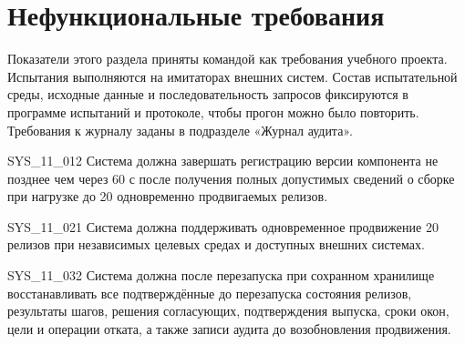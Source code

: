 \documentclass{tpks}
\begin{document}
\section{Нефункциональные требования}\label{sec:nonfunctional}

Показатели этого раздела приняты командой как требования учебного проекта.
Испытания выполняются на имитаторах внешних систем. Состав испытательной среды,
исходные данные и последовательность запросов фиксируются в программе испытаний
и протоколе, чтобы прогон можно было повторить. Требования к журналу заданы в подразделе «Журнал аудита».

\begin{req}{SYS_11_01}{2}
Система должна завершать регистрацию версии компонента не позднее чем через 60 с после получения полных допустимых сведений о сборке при нагрузке до 20 одновременно продвигаемых релизов.
\end{req}

\begin{req}{SYS_11_02}{1}
Система должна поддерживать одновременное продвижение 20 релизов при независимых целевых средах и доступных внешних системах.
\end{req}

\begin{req}{SYS_11_03}{2}
Система должна после перезапуска при сохранном хранилище восстанавливать все подтверждённые до перезапуска состояния релизов, результаты шагов, решения согласующих, подтверждения выпуска, сроки окон, цели и операции отката,
а также записи аудита до возобновления продвижения.
\end{req}
\end{document}
